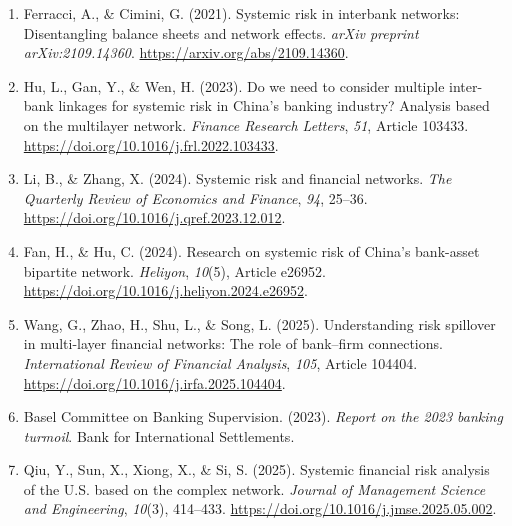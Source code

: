 \begin{enumerate}
  system. \textit{Finance Research Letters}, \textit{34}, Article 101236.
  \url{https://doi.org/10.1016/j.frl.2019.07.009}.
\item
  Ferracci, A., \& Cimini, G. (2021). Systemic risk in interbank
  networks: Disentangling balance sheets and network effects.
  \textit{arXiv preprint arXiv:2109.14360}.
  \url{https://arxiv.org/abs/2109.14360}.
\item
  Hu, L., Gan, Y., \& Wen, H. (2023). Do we need to consider multiple
  inter-bank linkages for systemic risk in China's banking industry?
  Analysis based on the multilayer network. \textit{Finance Research
  Letters}, \textit{51}, Article 103433.
  \url{https://doi.org/10.1016/j.frl.2022.103433}.
\item
  Li, B., \& Zhang, X. (2024). Systemic risk and financial networks.
  \textit{The Quarterly Review of Economics and Finance}, \textit{94},
  25--36.
  \url{https://doi.org/10.1016/j.qref.2023.12.012}.
\item
  Fan, H., \& Hu, C. (2024). Research on systemic risk of China's
  bank-asset bipartite network. \textit{Heliyon}, \textit{10}(5), Article
  e26952.
  \url{https://doi.org/10.1016/j.heliyon.2024.e26952}.
\item
  Wang, G., Zhao, H., Shu, L., \& Song, L. (2025). Understanding risk
  spillover in multi-layer financial networks: The role of bank--firm
  connections. \textit{International Review of Financial Analysis},
  \textit{105}, Article 104404.
  \url{https://doi.org/10.1016/j.irfa.2025.104404}.
\item
  Basel Committee on Banking Supervision. (2023). \textit{Report on the
  2023 banking turmoil}. Bank for International Settlements.
\item
  Qiu, Y., Sun, X., Xiong, X., \& Si, S. (2025). Systemic financial risk
  analysis of the U.S. based on the complex network. \textit{Journal of
  Management Science and Engineering}, \textit{10}(3), 414--433.
  \url{https://doi.org/10.1016/j.jmse.2025.05.002}.
\end{enumerate}

\endgroup
